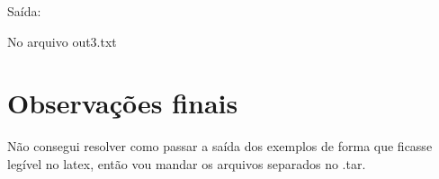 \documentclass[a4paper,11pt]{article}
\theoremstyle{mytheor}
\begin{document}
Saída:\newline

No arquivo out3.txt\newline



\section*{Observações finais}

Não consegui resolver como passar a saída dos exemplos de forma que ficasse legível no latex, então vou mandar os arquivos separados no .tar.
\end{document}
